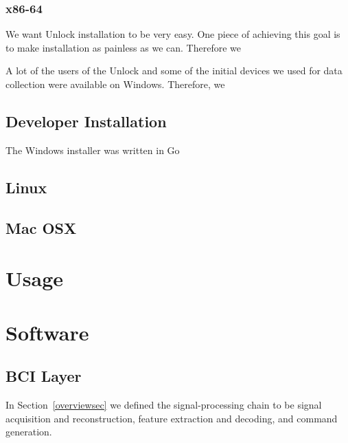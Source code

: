 \documentclass[11pt]{article}
\begin{document}
\subsubsection{x86-64}

We want Unlock installation to be very easy.  One piece of achieving this goal is to make installation as painless as we can.  Therefore we 

A lot of the users of the Unlock and some of the initial devices we used for data collection were available on Windows.  Therefore, we 

\subsection{Developer Installation}

The Windows installer was written in Go~\cite{golang}
%
%
\subsection{Linux}
\subsection{Mac OSX}

\section{Usage}

\section{Software}
\subsection{BCI Layer}\label{bcisec}

In Section~\ref{overviewsec} we defined the signal-processing chain to be signal acquisition and reconstruction, feature extraction and decoding, and command generation.
\end{document}
